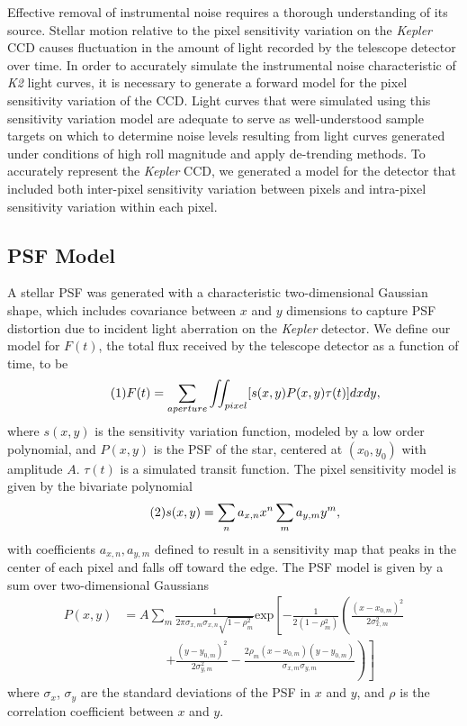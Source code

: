 \documentclass[12pt,preprint]{aastex}
\begin{document}
Effective removal of instrumental noise requires a thorough understanding of its source. Stellar motion relative to the pixel sensitivity variation on the \textit{Kepler} CCD causes fluctuation in the amount of light recorded by the telescope detector over time. In order to accurately simulate the instrumental noise characteristic of \textit{K2} light curves, it is necessary to generate a forward model for the pixel sensitivity variation of the CCD. Light curves that were simulated using this sensitivity variation model are adequate to serve as well-understood sample targets on which to determine noise levels resulting from light curves generated under conditions of high roll magnitude and apply de-trending methods. To accurately represent the \textit{Kepler} CCD, we generated a model for the detector that included both inter-pixel sensitivity variation between pixels and intra-pixel sensitivity variation within each pixel.

\subsection{PSF Model}

A stellar PSF was generated with a characteristic two-dimensional Gaussian shape, which includes covariance between $x$ and $y$ dimensions to capture PSF distortion due to incident light aberration on the \textit{Kepler} detector. We define our model for $F(t)$, the total flux received by the telescope detector as a function of time, to be
%
\[
\tag{1}
F(t)=\sum_{aperture} \iint_{pixel} [s(x,y)P(x,y)\tau (t)]dxdy,\\
\]
%
where $s(x,y)$ is the sensitivity variation function, modeled by a low order polynomial, and $P(x,y)$ is the PSF of the star, centered at $(x_0,y_0)$ with amplitude $A$. $\tau (t)$ is a simulated transit function. The pixel sensitivity model is given by the bivariate polynomial
%
\[
\tag{2}
s(x,y) = \sum_n a_{x,n}x^n\sum_m a_{y,m}y^m, \\
\]
%
with coefficients $a_{x,n}, a_{y,m}$ defined to result in a sensitivity map that peaks in the center of each pixel and falls off toward the edge. The PSF model is given by a sum over two-dimensional Gaussians
%
\[
\tag{3}
\begin{split}
P(x,y) & = A \sum_m \frac{1}{2\pi\sigma_{x,m}\sigma_{x,n}\sqrt{1-\rho_m^2}} \text{exp}\left[ -\frac{1}{2(1-\rho_m^2)} \left( \frac{(x-x_{0,m})^2}{2\sigma_{x,m}^2} \right. \right. \\
			 & \phantom{xxxxxx} \left. \left. + \frac{(y-y_{0,m})^2}{2\sigma_{y,m}^2} - \frac{2\rho_m  (x-x_{0,m})(y-y_{0,m})}{\sigma_{x,m}\sigma_{y,m}} \right) \right]
\end{split}
\]
%
where $\sigma_x$, $\sigma_y$ are the standard deviations of the PSF in $x$ and $y$, and $\rho$ is the correlation coefficient between $x$ and $y$.
\end{document}
